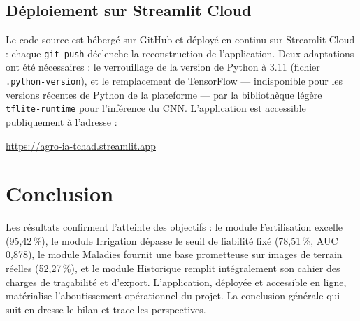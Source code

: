 \subsection{Déploiement sur Streamlit Cloud}

Le code source est hébergé sur GitHub et déployé en continu sur
Streamlit Cloud \cite{agroiatchad2026} : chaque
\texttt{git push} déclenche la reconstruction de l'application.
Deux adaptations ont été nécessaires : le verrouillage de la
version de Python à 3.11 (fichier \texttt{.python-version}),
et le remplacement de TensorFlow --- indisponible pour les
versions récentes de Python de la plateforme --- par la
bibliothèque légère \texttt{tflite-runtime} pour l'inférence du
CNN. L'application est accessible publiquement à l'adresse :

\begin{center}
	\url{https://agro-ia-tchad.streamlit.app}
\end{center}

\section*{Conclusion}

Les résultats confirment l'atteinte des objectifs : le module
Fertilisation excelle (95,42\,\%), le module Irrigation dépasse
le seuil de fiabilité fixé (78,51\,\%, AUC 0,878), le module
Maladies fournit une base prometteuse sur images de terrain
réelles (52,27\,\%), et le module Historique remplit
intégralement son cahier des charges de traçabilité et d'export.
L'application, déployée et accessible en ligne, matérialise
l'aboutissement opérationnel du projet. La conclusion générale
qui suit en dresse le bilan et trace les perspectives.